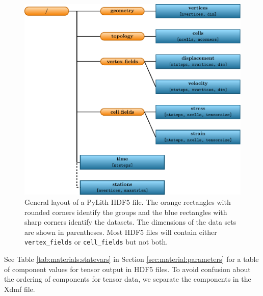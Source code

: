 \begin{figure}[htbp]
  \includegraphics{runpylith/figs/hdf5layout}
  \caption{General layout of a PyLith HDF5 file. The orange rectangles
    with rounded corners identify the groups and the blue rectangles
    with sharp corners identify the datasets. The dimensions of the
    data sets are shown in parentheses. Most HDF5 files will contain
    either \texttt{vertex\_fields} or \texttt{cell\_fields} but not
    both.}
 \label{fig:hdf5:layout}
\end{figure}

See Table \vref{tab:materials:statevars} in Section
\vref{sec:material:parameters} for a table of component values for
tensor output in HDF5 files. To avoid confusion about the ordering of
components for tensor data, we separate the components in the Xdmf
file.

